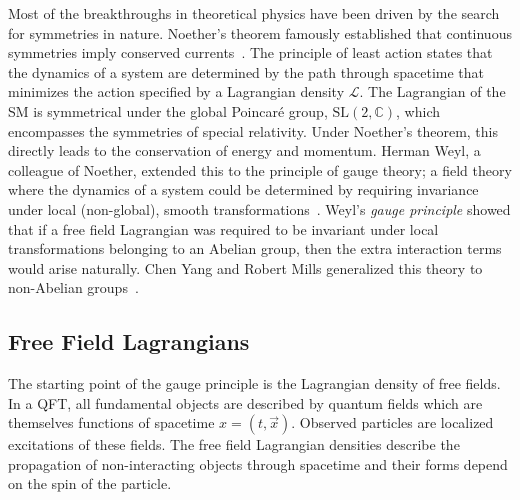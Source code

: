 Most of the breakthroughs in theoretical physics have been driven by the search for symmetries in nature.
Noether's theorem famously established that continuous symmetries imply conserved currents~\cite{Noether1918}.
The principle of least action states that the dynamics of a system are determined by the path through spacetime that minimizes the action specified by a Lagrangian density $\mathcal{L}$.
The Lagrangian of the SM is symmetrical under the global Poincaré group, $\text{SL}(2, \mathbb{C})$, which encompasses the symmetries of special relativity.
Under Noether's theorem, this directly leads to the conservation of energy and momentum.
Herman Weyl, a colleague of Noether, extended this to the principle of gauge theory; a field theory where the dynamics of a system could be determined by requiring invariance under local (non-global), smooth transformations~\cite{GaugeSym}.
Weyl's \textit{gauge principle} showed that if a free field Lagrangian was required to be invariant under local transformations belonging to an Abelian group, then the extra interaction terms would arise naturally.
Chen Yang and Robert Mills generalized this theory to non-Abelian groups~\cite{YangMills}.

\subsection{Free Field Lagrangians}

The starting point of the gauge principle is the Lagrangian density of free fields.
In a QFT, all fundamental objects are described by quantum fields which are themselves functions of spacetime $x = (t, \vec{x})$.
Observed particles are localized excitations of these fields.
The free field Lagrangian densities describe the propagation of non-interacting objects through spacetime and their forms depend on the spin of the particle.

